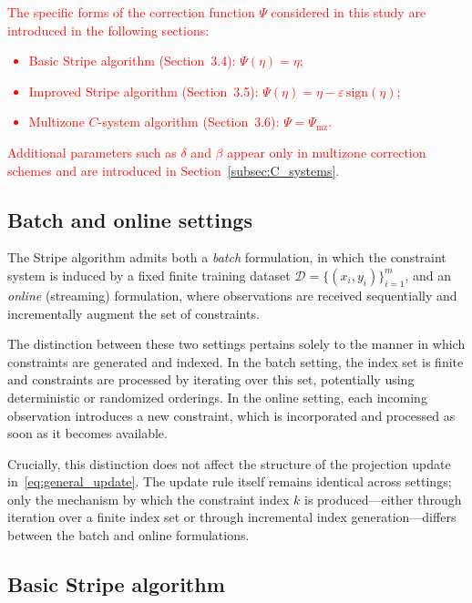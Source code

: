 \documentclass[a4paper,fleqn]{cas-sc}
\begin{document}
\textcolor{red}{The specific forms of the correction function $\Psi$
considered in this study are introduced in the following sections:}
\textcolor{red}{
\begin{itemize}
\item Basic Stripe algorithm (Section~3.4):
      $\Psi(\eta)=\eta$;
\item Improved Stripe algorithm (Section~3.5):
      $\Psi(\eta)=\eta-\varepsilon\,\mathrm{sign}(\eta)$;
\item Multizone $C$-system algorithm (Section~3.6):
      $\Psi=\Psi_{\mathrm{mz}}$.
\end{itemize}
}
\textcolor{red}{
Additional parameters such as $\delta$ and $\beta$
appear only in multizone correction schemes and are introduced
in Section~\ref{subsec:C_systems}.}


\subsection{Batch and online settings}


The Stripe algorithm admits both a \emph{batch} formulation, in which the constraint system is induced by a fixed finite training dataset $\mathcal{D}=\{(x_i,y_i)\}_{i=1}^m$, and an \emph{online} (streaming) formulation, where observations are received sequentially and incrementally augment the set of constraints.

The distinction between these two settings pertains solely to the manner in which constraints are generated and indexed.
In the batch setting, the index set is finite and constraints are processed by iterating over this set, potentially using deterministic or randomized orderings.
In the online setting, each incoming observation introduces a new constraint, which is incorporated and processed as soon as it becomes available.

Crucially, this distinction does not affect the structure of the projection update in~\eqref{eq:general_update}.
The update rule itself remains identical across settings; only the mechanism by which the constraint index $k$ is produced—either through iteration over a finite index set or through incremental index generation—differs between the batch and online formulations.


\subsection{Basic Stripe algorithm}
\end{document}
